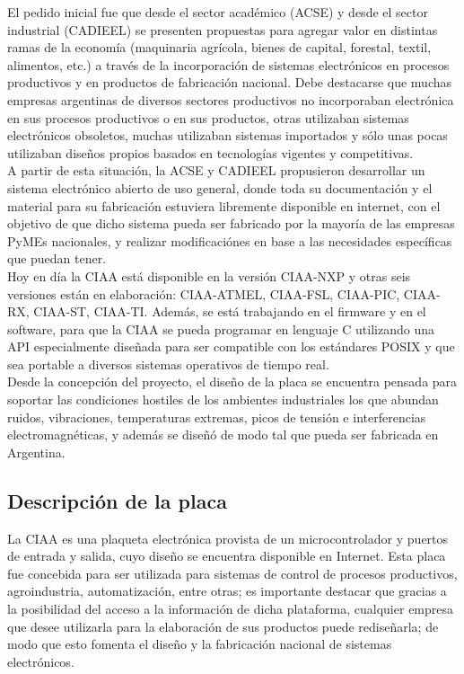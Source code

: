 \documentclass[12pt,letterpaper]{article}
\begin{document}
El pedido inicial fue que desde el sector académico (ACSE) y desde el sector industrial (CADIEEL) se presenten propuestas para agregar valor en distintas ramas de la economía (maquinaria agrícola, bienes de capital, forestal, textil, alimentos, etc.) a través de la incorporación de sistemas electrónicos en procesos productivos y en productos de fabricación nacional. Debe destacarse que muchas empresas argentinas de diversos sectores productivos no incorporaban electrónica en sus procesos productivos o en sus productos, otras utilizaban sistemas electrónicos obsoletos, muchas utilizaban sistemas importados y sólo unas pocas utilizaban diseños propios basados en tecnologías vigentes y competitivas.
  \\

A partir de esta situación, la ACSE y CADIEEL propusieron desarrollar un sistema electrónico abierto de uso general, donde toda su documentación y el material para su fabricación estuviera libremente disponible en internet, con el objetivo de que dicho sistema pueda ser fabricado por la mayoría de las empresas PyMEs nacionales, y realizar modificaciónes en base a las necesidades específicas que puedan tener.
  \\

Hoy en día la CIAA está disponible en la versión CIAA-NXP y otras seis versiones están en elaboración: CIAA-ATMEL, CIAA-FSL, CIAA-PIC, CIAA-RX, CIAA-ST, CIAA-TI. Además, se está trabajando en el firmware y en el software, para que la CIAA se pueda programar en lenguaje C utilizando una API especialmente diseñada para ser compatible con los estándares POSIX y que sea portable a diversos sistemas operativos de tiempo real.
  \\

Desde la concepción del proyecto, el diseño de la placa se encuentra pensada para soportar las condiciones hostiles de los ambientes industriales los que abundan ruidos, vibraciones, temperaturas extremas, picos de tensión e interferencias electromagnéticas, y además se diseñó de modo tal que pueda ser fabricada en Argentina\cite{origeneduciaa}.

\subsection{Descripción de la placa}

La CIAA es una plaqueta electrónica provista de un microcontrolador y puertos de entrada y salida, cuyo diseño se encuentra disponible en Internet. Esta placa fue concebida para ser utilizada para sistemas de control de procesos productivos, agroindustria, automatización, entre otras; es importante destacar que gracias a la posibilidad del acceso a la información de dicha plataforma, cualquier empresa que desee utilizarla para la elaboración de sus productos puede rediseñarla; de modo que esto fomenta el diseño y la fabricación nacional de sistemas electrónicos.
\end{document}
